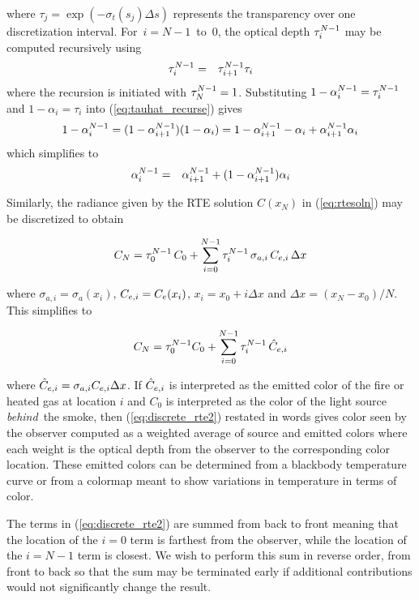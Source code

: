 \noindent where $\tau_j=\exp\left(-\sigma_t(s_j)\Delta s\right)$
represents the transparency over one discretization interval.
For~$i=N-1$~to~$0$, the optical depth $\tau_{i}^{N-1}$ may be computed
recursively using
\begin{eqnarray}
\label{eq:tauhat_recurse}
\tau_{i}^{N-1}&=&\tau_{i+1}^{N-1}\tau_i
\end{eqnarray}
\noindent where the recursion is initiated with $\tau_{N}^{N-1}=1$.
Substituting $1-\alpha_{i}^{N-1}=\tau_{i}^{N-1}$ and $1-\alpha_i=\tau_i$ into
(\ref{eq:tauhat_recurse}) gives
\begin{eqnarray}
1-\alpha_{i}^{N-1}=(1-\alpha_{i+1}^{N-1})(1-\alpha_i)=1-\alpha_{i+1}^{N-1} - \alpha_i + \alpha_{i+1}^{N-1}\alpha_i
\end{eqnarray}
which simplifies to
\begin{eqnarray}
\label{eq:alpha2}
\alpha_{i}^{N-1}&=&\alpha_{i+1}^{N-1} + (1-\alpha_{i+1}^{N-1})\alpha_i
\end{eqnarray}

Similarly, the radiance given by the RTE solution $C(x_N)$ in (\ref{eq:rtesoln}) may be discretized to obtain

\begin{eqnarray}
C_{N} = \tau_{0}^{N-1}\,C_0 +
\sum_{i=0}^{N-1}\tau_{i}^{N-1}\,\sigma_{a,i}\,C_{e,i}\,\Delta x
\end{eqnarray}

\noindent where $\sigma_{a,i}=\sigma_a(x_i)$, $C_{e,i}=C_e(x_i)$,
$x_i=x_0+i\Delta x$ and $\Delta x=(x_N-x_0)/N$. This simplifies to

\begin{equation}
\label{eq:discrete_rte2}
C_N = \tau_{0}^{N-1}C_0 + \sum_{i=0}^{N-1}\tau_{i}^{N-1}\,\hat{C}_{e,i}
\end{equation}

\noindent where $\hat{C}_{e,i}=\sigma_{a,i}C_{e,i}\Delta x$.  If
$\hat{C}_{e,i}$ is interpreted as the emitted color of the fire or
heated gas at location $i$ and $C_0$ is interpreted as the color
of the light source {\em behind}\ the smoke, then
(\ref{eq:discrete_rte2}) restated in words gives color seen by the
observer computed as a weighted average of source and emitted
colors where each weight is the optical depth from the observer to
the corresponding color location.  These emitted colors can be
determined from a blackbody temperature curve or from a colormap
meant to show variations in temperature in terms of color.


The terms in (\ref{eq:discrete_rte2}) are summed from back to front meaning that the location of the $i=0$ term is farthest from the observer, while the location of the $i=N-1$ term is closest.  We wish to perform this sum in reverse order, from front to back so that the sum may be terminated early if additional contributions would not significantly change the result.

